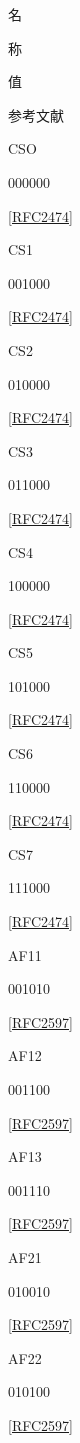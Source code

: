 名

称

值

参考文献

CSO

000000

\href{https://www.rfc-editor.org/rfc/rfc2474}{[RFC2474]}

CS1

001000

\href{https://www.rfc-editor.org/rfc/rfc2474}{[RFC2474]}

CS2

010000

\href{https://www.rfc-editor.org/rfc/rfc2474}{[RFC2474]}

CS3

011000

\href{https://www.rfc-editor.org/rfc/rfc2474}{[RFC2474]}

CS4

100000

\href{https://www.rfc-editor.org/rfc/rfc2474}{[RFC2474]}

CS5

101000

\href{https://www.rfc-editor.org/rfc/rfc2474}{[RFC2474]}

CS6

110000

\href{https://www.rfc-editor.org/rfc/rfc2474}{[RFC2474]}

CS7

111000

\href{https://www.rfc-editor.org/rfc/rfc2474}{[RFC2474]}

AF11

001010

\href{https://www.rfc-editor.org/rfc/rfc2597}{[RFC2597]}

AF12

001100

\href{https://www.rfc-editor.org/rfc/rfc2597}{[RFC2597]}

AF13

001110

\href{https://www.rfc-editor.org/rfc/rfc2597}{[RFC2597]}

AF21

010010

\href{https://www.rfc-editor.org/rfc/rfc2597}{[RFC2597]}

AF22

010100

\href{https://www.rfc-editor.org/rfc/rfc2597}{[RFC2597]}

